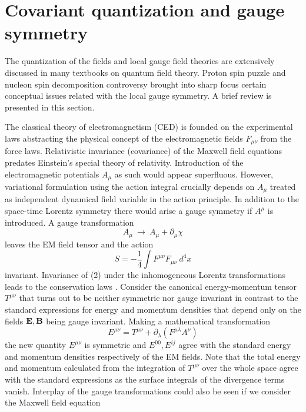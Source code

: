 \documentclass[aps, singlecolumn, showpacs]{revtex4-2}
\begin{document}
\section{\bf Covariant quantization and gauge symmetry}

The quantization of the fields and local gauge field theories are extensively discussed in many textbooks on quantum field theory. Proton spin puzzle and nucleon spin decomposition controversy \cite{4,5} brought into sharp focus certain conceptual issues related with the local gauge symmetry. A brief review is presented in this section.

The classical theory of electromagnetism (CED) is founded on the experimental laws abstracting the physical concept of the electromagnetic fields $F_{\mu\nu}$ from the force laws. Relativistic invariance (covariance) of the Maxwell field equations predates Einstein's special theory of relativity. Introduction of the electromagnetic potentials $A_\mu$ as such would appear superfluous. However, variational formulation using the action integral crucially depends on $A_\mu$ treated as independent dynamical field variable in the action principle. In addition to the space-time Lorentz symmetry there would arise a gauge symmetry if $A^\mu$ is introduced. A gauge transformation
\begin{equation}
A_\mu ~ \rightarrow ~ A_\mu +\partial_\mu \chi
\end{equation}
leaves the EM field tensor and the action
\begin{equation}
S = -\frac{1}{4}\int F^{\mu\nu} F_{\mu\nu} ~d^4 x
\end{equation}
invariant. Invariance of (2) under the inhomogeneous Lorentz transformations leads to the conservation laws \cite{22}. Consider the canonical energy-momentum tensor $T^{\mu\nu}$ that turns out to be neither symmetric nor gauge invariant in contrast to the standard expressions for energy and momentum densities that depend only on the fields ${\bf E}, {\bf B}$ being gauge invariant. Making a mathematical transformation
\begin{equation}
E^{\mu\nu} = T^{\mu\nu} + \partial_\lambda (F^{\mu\lambda} A^\nu)
\end{equation}
the new quantity $E^{\mu\nu}$ is symmetric and $E^{00}, E^{ij}$ agree with the standard energy and momentum densities respectively of the EM fields. Note that the total energy and momentum calculated from the integration of $T^{\mu\nu}$ over the whole space agree with the standard expressions as the surface integrals of the divergence terms vanish. Interplay of the gauge transformations could also be seen if we consider the Maxwell field equation 
\end{document}
